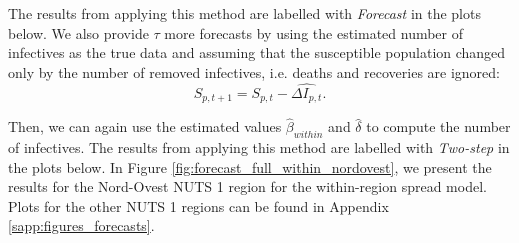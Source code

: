 \documentclass[12pt]{article}
\begin{document}
	The results from applying this method are labelled with \textit{Forecast} in the plots below. We also provide $\tau$ more forecasts by using the estimated number of infectives as the true data and assuming that the susceptible population changed only by the number of removed infectives, i.e. deaths and recoveries are ignored:
	    \[S_{p, t+1} = S_{p,t} - \widehat{\Delta I_{p,t}}.\]
	    
	Then, we can again use the estimated values $\widehat{\beta}_{within}$ and $\widehat{\delta}$ to compute the number of infectives. The results from applying this method are labelled with \textit{Two-step} in the plots below. In Figure \ref{fig:forecast_full_within_nordovest}, we present the results for the Nord-Ovest NUTS 1 region for the within-region spread model. Plots for the other NUTS 1 regions can be found in Appendix \ref{sapp:figures_forecasts}.
	
\end{document}
